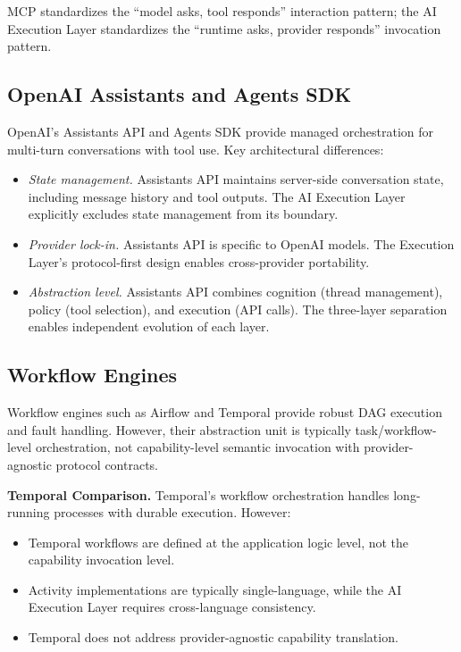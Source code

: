 MCP standardizes the ``model asks, tool responds'' interaction pattern; the AI Execution Layer standardizes the ``runtime asks, provider responds'' invocation pattern.

\subsection{OpenAI Assistants and Agents SDK}

OpenAI's Assistants API and Agents SDK provide managed orchestration for multi-turn conversations with tool use. Key architectural differences:
\begin{itemize}
    \item \emph{State management.} Assistants API maintains server-side conversation state, including message history and tool outputs. The AI Execution Layer explicitly excludes state management from its boundary.
    \item \emph{Provider lock-in.} Assistants API is specific to OpenAI models. The Execution Layer's protocol-first design enables cross-provider portability.
    \item \emph{Abstraction level.} Assistants API combines cognition (thread management), policy (tool selection), and execution (API calls). The three-layer separation enables independent evolution of each layer.
\end{itemize}

\subsection{Workflow Engines}

Workflow engines such as Airflow and Temporal provide robust DAG execution and fault handling. However, their abstraction unit is typically task/workflow-level orchestration, not capability-level semantic invocation with provider-agnostic protocol contracts.

\textbf{Temporal Comparison.} Temporal's workflow orchestration handles long-running processes with durable execution. However:
\begin{itemize}
    \item Temporal workflows are defined at the application logic level, not the capability invocation level.
    \item Activity implementations are typically single-language, while the AI Execution Layer requires cross-language consistency.
    \item Temporal does not address provider-agnostic capability translation.
\end{itemize}


